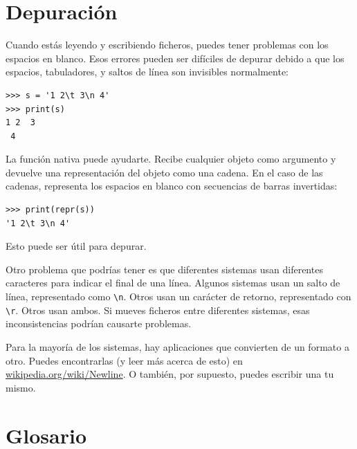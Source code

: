  

\hypertarget{depuraciuxf3n}{%
\section{Depuración}\label{depuraciuxf3n}}

 

Cuando estás leyendo y escribiendo ficheros, puedes tener problemas con
los espacios en blanco. Esos errores pueden ser difíciles de depurar
debido a que los espacios, tabuladores, y saltos de línea son invisibles
normalmente:

\begin{Verbatim}[frame=single]
>>> s = '1 2\t 3\n 4'
>>> print(s)
1 2  3
 4
\end{Verbatim}

  

La función nativa  puede ayudarte. Recibe cualquier objeto
como argumento y devuelve una representación del objeto como una cadena.
En el caso de las cadenas, representa los espacios en blanco con
secuencias de barras invertidas:

\begin{Verbatim}[frame=single]
>>> print(repr(s))
'1 2\t 3\n 4'
\end{Verbatim}

Esto puede ser útil para depurar.

Otro problema que podrías tener es que diferentes sistemas usan
diferentes caracteres para indicar el final de una línea. Algunos
sistemas usan un salto de línea, representado como
\verb|\n|. Otros usan un carácter de retorno,
representado con \verb|\r|. Otros usan ambos. Si mueves
ficheros entre diferentes sistemas, esas inconsistencias podrían
causarte problemas.


Para la mayoría de los sistemas, hay aplicaciones que convierten de un
formato a otro. Puedes encontrarlas (y leer más acerca de esto) en
\url{wikipedia.org/wiki/Newline}. O también, por supuesto, puedes
escribir una tu mismo.

\hypertarget{glosario}{%
\section{Glosario}\label{glosario}}

